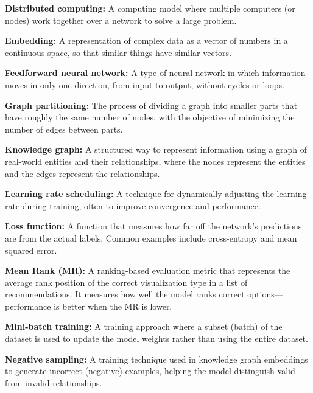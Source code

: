 \vspace{0.3cm}
\noindent\textbf{Distributed computing:} A computing model where multiple computers (or nodes) work together over a network to solve a large problem.

\vspace{0.3cm}
\noindent\textbf{Embedding:} A representation of complex data as a vector of numbers in a continuous space, so that similar things have similar vectors.

\vspace{0.3cm}
\noindent\textbf{Feedforward neural network:} A type of neural network in which information moves in only one direction, from input to output, without cycles or loops.

\vspace{0.3cm}
\noindent\textbf{Graph partitioning:} The process of dividing a graph into smaller parts that have roughly the same number of nodes, with the objective of minimizing the number of edges between parts.

\vspace{0.3cm}
\noindent\textbf{Knowledge graph:} A structured way to represent information using a graph of real-world entities and their relationships, where the nodes represent the entities and the edges represent the relationships.

\vspace{0.3cm}
\noindent\textbf{Learning rate scheduling:} A technique for dynamically adjusting the learning rate during training, often to improve convergence and performance.

\vspace{0.3cm}
\noindent\textbf{Loss function:} A function that measures how far off the network’s predictions are from the actual labels. Common examples include cross-entropy and mean squared error.

\vspace{0.3cm}
\noindent\textbf{Mean Rank (MR):} A ranking-based evaluation metric that represents the average rank position of the correct visualization type in a list of recommendations. It measures how well the model ranks correct options—performance is better when the MR is lower.

\vspace{0.3cm}
\noindent\textbf{Mini-batch training:} A training approach where a subset (batch) of the dataset is used to update the model weights rather than using the entire dataset.

\vspace{0.3cm}
\noindent\textbf{Negative sampling:} A training technique used in knowledge graph embeddings to generate incorrect (negative) examples, helping the model distinguish valid from invalid relationships.

